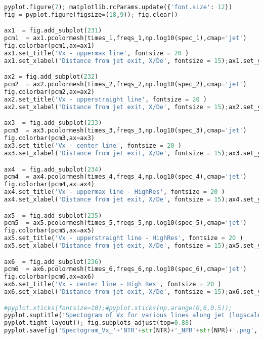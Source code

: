 \begin{lstlisting}[language=Python]
pyplot.figure(7); matplotlib.rcParams.update({'font.size': 12})
fig = pyplot.figure(figsize=(18,9)); fig.clear()

ax1  = fig.add_subplot(231)
pcm1  = ax1.pcolormesh(times_1,freqs_1,np.log10(spec_1),cmap='jet')
fig.colorbar(pcm1,ax=ax1)
ax1.set_title('Vx - uppermax line', fontsize = 20 )  
ax1.set_xlabel('Distance from jet exit, X/De', fontsize = 15);ax1.set_ylabel('wavenumbers*De', fontsize = 15)

ax2 = fig.add_subplot(232)
pcm2  = ax2.pcolormesh(times_2,freqs_2,np.log10(spec_2),cmap='jet')
fig.colorbar(pcm2,ax=ax2)
ax2.set_title('Vx - upperstraight line', fontsize = 20 )  
ax2.set_xlabel('Distance from jet exit, X/De', fontsize = 15);ax2.set_ylabel('wavenumbers*De', fontsize = 15)

ax3  = fig.add_subplot(233)
pcm3  = ax3.pcolormesh(times_3,freqs_3,np.log10(spec_3),cmap='jet')
fig.colorbar(pcm3,ax=ax3)
ax3.set_title('Vx - center line', fontsize = 20 )  
ax3.set_xlabel('Distance from jet exit, X/De', fontsize = 15);ax3.set_ylabel('wavenumbers*De', fontsize = 15)

ax4  = fig.add_subplot(234)
pcm4  = ax4.pcolormesh(times_4,freqs_4,np.log10(spec_4),cmap='jet')
fig.colorbar(pcm4,ax=ax4)
ax4.set_title('Vx - uppermax line - HighRes', fontsize = 20 )  
ax4.set_xlabel('Distance from jet exit, X/De', fontsize = 15);ax4.set_ylabel('wavenumbers*De', fontsize = 15)

ax5  = fig.add_subplot(235)
pcm5  = ax5.pcolormesh(times_5,freqs_5,np.log10(spec_5),cmap='jet')
fig.colorbar(pcm5,ax=ax5)
ax5.set_title('Vx - upperstraight line - HighRes', fontsize = 20 )  
ax5.set_xlabel('Distance from jet exit, X/De', fontsize = 15);ax5.set_ylabel('wavenumbers*De', fontsize = 15)

ax6  = fig.add_subplot(236)
pcm6  = ax6.pcolormesh(times_6,freqs_6,np.log10(spec_6),cmap='jet')
fig.colorbar(pcm6,ax=ax6)
ax6.set_title('Vx - center line - High Res', fontsize = 20 )  
ax6.set_xlabel('Distance from jet exit, X/De', fontsize = 15);ax6.set_ylabel('wavenumbers*De', fontsize = 15)

#pyplot.xticks(fontsize=10);#pyplot.xticks(np.arange(0,6,0.5));
pyplot.suptitle('Spectogram of Vx for various lines along jet (logscaled)'+' at NTR '+str(NTR)+', NPR '+str(NPR), fontsize =25 )
pyplot.tight_layout(); fig.subplots_adjust(top=0.88)
pyplot.savefig('Spectogram_Vx_'+'NTR'+str(NTR)+'_NPR'+str(NPR)+'.png', dpi=300)


\end{lstlisting}
